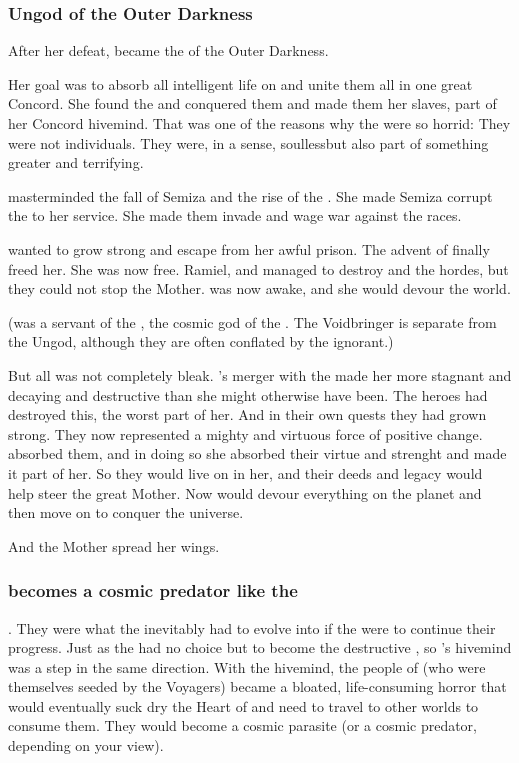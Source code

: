 \subsubsection{Ungod of the Outer Darkness}
%
After her defeat, \Tiamat became the  of the Outer Darkness. 

Her goal was to absorb all intelligent life on \Miith and unite them all in one great Concord. 
She found the \banes and conquered them and made them her slaves, part of her Concord hivemind. 
That was one of the reasons why the \banes were so horrid: 
They were not individuals. 
They were, in a sense, soulless\dash but also part of something greater and terrifying. 

\Tiamat masterminded the fall of Semiza and the rise of the \resphain.
She made Semiza corrupt the \resphain to her service. 
She made them invade \Miith and wage war against the \ophidian races. 

\Tiamat wanted to grow strong and escape from her awful prison. 
The advent of \Lithrim finally freed her. 
She was now free. 
Ramiel, \Azeraid and \Iscrafel managed to destroy \Daggerrain and the \bane hordes, but they could not stop the Mother. 
\Tiamat was now awake, and she would devour the world. 

(\Daggerrain was a servant of the , the cosmic god of the \banes. 
The Voidbringer is separate from the Ungod, although they are often conflated by the ignorant.)

But all was not completely bleak. 
\Tiamat's merger with the \banes made her more stagnant and decaying and destructive than she might otherwise have been.
The heroes had destroyed this, the worst part of her. 
And in their own quests they had grown strong.
They now represented a mighty and virtuous force of positive change. 
\Tiamat absorbed them, and in doing so she absorbed their virtue and strenght and made it part of her.
So they would live on in her, and their deeds and legacy would help steer the great Mother. 
Now \Tiamat would devour everything on the planet and then move on to conquer the universe. 

And the Mother spread her wings. 





\subsubsection{\Tiamat becomes a cosmic predator like the \banes}
. 
They were what the \voyagers inevitably had to evolve into if the \voyagers were to continue their progress. 
Just as the \voyagers had no choice but to become the destructive \banes, so \Tiamat's hivemind was a step in the same direction. 
With the hivemind, the people of \Miith (who were themselves seeded by the Voyagers) became a bloated, life-consuming horror that would eventually suck dry the Heart of \Miith and need to travel to other worlds to consume them. 
They would become a cosmic parasite (or a cosmic predator, depending on your view).

